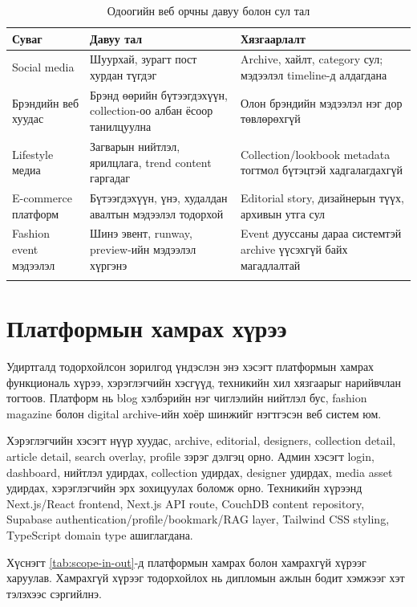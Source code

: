 \begin{longtable}{|L{0.22\textwidth}|L{0.31\textwidth}|L{0.33\textwidth}|}
  \hline
  \textbf{Суваг} & \textbf{Давуу тал} & \textbf{Хязгаарлалт} \\ \hline
  Social media & Шуурхай, зурагт пост хурдан түгдэг & Archive, хайлт, category сул; мэдээлэл timeline-д алдагдана \\ \hline
  Брэндийн веб хуудас & Брэнд өөрийн бүтээгдэхүүн, collection-оо албан ёсоор танилцуулна & Олон брэндийн мэдээлэл нэг дор төвлөрөхгүй \\ \hline
  Lifestyle медиа & Загварын нийтлэл, ярилцлага, trend content гаргадаг & Collection/lookbook metadata тогтмол бүтэцтэй хадгалагдахгүй \\ \hline
  E-commerce платформ & Бүтээгдэхүүн, үнэ, худалдан авалтын мэдээлэл тодорхой & Editorial story, дизайнерын түүх, архивын утга сул \\ \hline
  Fashion event мэдээлэл & Шинэ эвент, runway, preview-ийн мэдээлэл хүргэнэ & Event дууссаны дараа системтэй archive үүсэхгүй байх магадлалтай \\ \hline
  \caption{Одоогийн веб орчны давуу болон сул тал}
  \label{tab:current-web-context}\\
\end{longtable}

\section{Платформын хамрах хүрээ}
Удиртгалд тодорхойлсон зорилгод үндэслэн энэ хэсэгт платформын хамрах функциональ хүрээ, хэрэглэгчийн хэсгүүд, техникийн хил хязгаарыг нарийвчлан тогтоов. Платформ нь blog хэлбэрийн нэг чиглэлийн нийтлэл бус, fashion magazine болон digital archive-ийн хоёр шинжийг нэгтгэсэн веб систем юм.

Хэрэглэгчийн хэсэгт нүүр хуудас, archive, editorial, designers, collection detail, article detail, search overlay, profile зэрэг дэлгэц орно. Админ хэсэгт login, dashboard, нийтлэл удирдах, collection удирдах, designer удирдах, media asset удирдах, хэрэглэгчийн эрх зохицуулах боломж орно. Техникийн хүрээнд Next.js/React frontend, Next.js API route, CouchDB content repository, Supabase authentication/profile/bookmark/RAG layer, Tailwind CSS styling, TypeScript domain type ашиглагдана.

Хүснэгт \ref{tab:scope-in-out}-д платформын хамрах болон хамрахгүй хүрээг харуулав. Хамрахгүй хүрээг тодорхойлох нь дипломын ажлын бодит хэмжээг хэт тэлэхээс сэргийлнэ.

